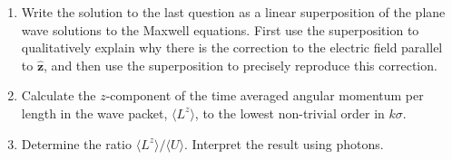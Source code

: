 \begin{exercise}
\begin{enumerate}
    \textit{Hint: try a solution for $\mathbf{E}$ (and analogously for $\mathbf{B}$) of the form}
    \begin{equation}
        \mathbf{E}(t, \mathbf{r}) = \mathbf{E}^{(0)} + \mathbf{E}^{(1)}(x, y) e^{i(kz - \omega t)} \hat{\mathbf{z}}, \tag{4}
    \end{equation}
    \textit{and determine the correction $\mathbf{E}^{(1)}(x, y)$ in terms of $E_o(x, y)$ and its derivatives.}
    \item Write the solution to the last question as a linear superposition of the plane wave solutions to the Maxwell equations. First use the superposition to qualitatively explain why there is the correction to the electric field parallel to $\hat{\mathbf{z}}$, and then use the superposition to precisely reproduce this correction.
    \item Calculate the $z$-component of the time averaged angular momentum per length in the wave packet, $\langle L^z \rangle$, to the lowest non-trivial order in $k \sigma$.
    \item Determine the ratio $\langle L^z \rangle / \langle U \rangle$. Interpret the result using photons.
\end{enumerate}
\end{exercise}

